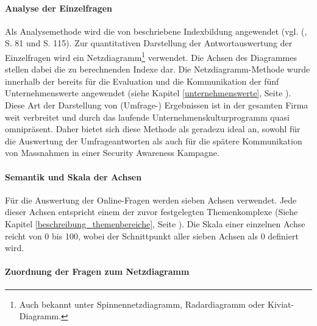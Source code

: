 \documentclass[../../main.tex]{subfiles}
\begin{document}
\paragraph*{Analyse der Einzelfragen}\mbox{}

\begin{sloppypar}
Als Analysemethode wird die von \citeauthor{mayer_interview_2013} beschriebene Indexbildung angewendet (vgl. \citeauthor{mayer_interview_2013} (\citeyear{mayer_interview_2013}, S. 81 und S. 115). Zur quantitativen Darstellung der Antwortauswertung der Einzelfragen wird ein Netzdiagramm\footnote{Auch bekannt unter Spinnennetzdiagramm, Radardiagramm oder Kiviat-Diagramm.} verwendet. Die Achsen des Diagrammes stellen dabei die zu berechnenden Indexe dar. Die Netzdiagramm-Methode wurde innerhalb der {\companyshort} bereits für die Evaluation und die Kommunikation der fünf Unternehmenswerte angewendet (siehe Kapitel \ref{unternehmenswerte}, Seite \pageref{unternehmenswerte}). Diese Art der Darstellung von (Umfrage-) Ergebnissen ist in der gesamten Firma weit verbreitet und durch das laufende Unternehmenskulturprogramm quasi omnipräsent. Daher bietet sich diese Methode als geradezu ideal an, sowohl für die Auswertung der Umfrageantworten als auch für die spätere Kommunikation von Massnahmen in einer Security Awareness Kampagne.
\end{sloppypar}


\paragraph*{Semantik und Skala der Achsen}\mbox{}

\begin{sloppypar}
Für die Auswertung der Online-Fragen werden sieben Achsen verwendet. Jede dieser Achsen entspricht einem der zuvor festgelegten Themenkomplexe (Siehe Kapitel \ref{beschreibung_themenbereiche}, Seite \pageref{beschreibung_themenbereiche}). Die Skala einer einzelnen Achse reicht von 0 bis 100, wobei der Schnittpunkt aller sieben Achsen als 0 definiert wird.\footnotemark
\end{sloppypar}


\paragraph*{Zuordnung der Fragen zum Netzdiagramm}\mbox{}
\end{document}

